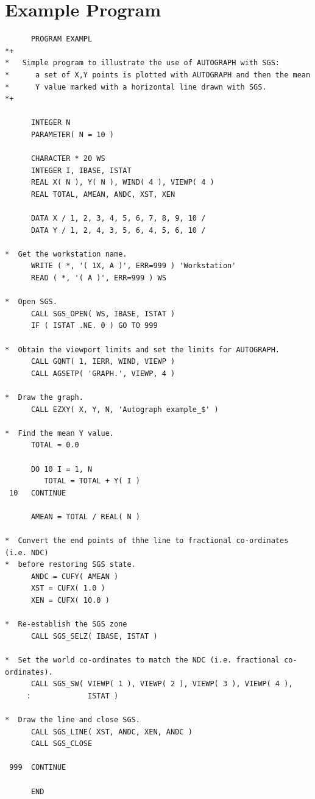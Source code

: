 \documentclass[twoside,11pt]{article}
\newcommand{\xlabel}[1]{}
\renewcommand{\_}{\texttt{\symbol{95}}}
\begin{document}
\appendix
\newpage

\section{\xlabel{example_program_labelexam_sect}Example Program}
\label{exam_sect}

\begin{small}
\begin{verbatim}
      PROGRAM EXAMPL
*+
*   Simple program to illustrate the use of AUTOGRAPH with SGS:
*      a set of X,Y points is plotted with AUTOGRAPH and then the mean 
*      Y value marked with a horizontal line drawn with SGS.
*+

      INTEGER N
      PARAMETER( N = 10 )

      CHARACTER * 20 WS
      INTEGER I, IBASE, ISTAT
      REAL X( N ), Y( N ), WIND( 4 ), VIEWP( 4 )
      REAL TOTAL, AMEAN, ANDC, XST, XEN

      DATA X / 1, 2, 3, 4, 5, 6, 7, 8, 9, 10 /
      DATA Y / 1, 2, 4, 3, 5, 6, 4, 5, 6, 10 /

*  Get the workstation name.
      WRITE ( *, '( 1X, A )', ERR=999 ) 'Workstation'
      READ ( *, '( A )', ERR=999 ) WS

*  Open SGS.
      CALL SGS_OPEN( WS, IBASE, ISTAT )
      IF ( ISTAT .NE. 0 ) GO TO 999

*  Obtain the viewport limits and set the limits for AUTOGRAPH.
      CALL GQNT( 1, IERR, WIND, VIEWP )
      CALL AGSETP( 'GRAPH.', VIEWP, 4 )

*  Draw the graph.
      CALL EZXY( X, Y, N, 'Autograph example_$' )

*  Find the mean Y value.
      TOTAL = 0.0

      DO 10 I = 1, N
         TOTAL = TOTAL + Y( I )
 10   CONTINUE

      AMEAN = TOTAL / REAL( N )

*  Convert the end points of thhe line to fractional co-ordinates (i.e. NDC)
*  before restoring SGS state.
      ANDC = CUFY( AMEAN )
      XST = CUFX( 1.0 )
      XEN = CUFX( 10.0 )

*  Re-establish the SGS zone
      CALL SGS_SELZ( IBASE, ISTAT )

*  Set the world co-ordinates to match the NDC (i.e. fractional co-ordinates).
      CALL SGS_SW( VIEWP( 1 ), VIEWP( 2 ), VIEWP( 3 ), VIEWP( 4 ), 
     :             ISTAT )

*  Draw the line and close SGS.
      CALL SGS_LINE( XST, ANDC, XEN, ANDC )
      CALL SGS_CLOSE

 999  CONTINUE

      END
\end{verbatim}
\end{small}
\end{document}
